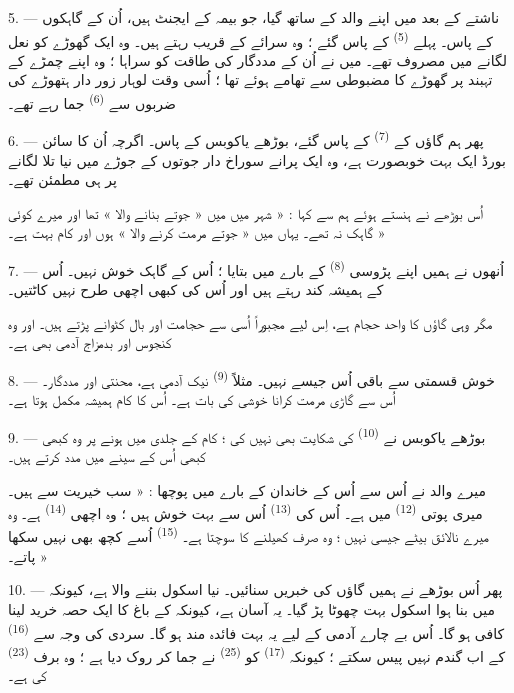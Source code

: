 \VUsaut{3.0mm}

5. --- ناشتے کے بعد میں اپنے والد کے ساتھ گیا، جو بیمہ کے ایجنٹ ہیں،
اُن کے گاہکوں کے پاس۔ پہلے  \textsuperscript{(5)} کے
پاس گئے ؛ وہ سرائے کے قریب رہتے ہیں۔ وہ ایک گھوڑے کو نعل لگانے میں
مصروف تھے۔ میں نے اُن کے مددگار کی طاقت کو سراہا ؛ وہ اپنے چمڑے کے
تہبند پر گھوڑے کا  مضبوطی سے تھامے ہوئے تھا ؛ اُسی وقت
لوہار زور دار ہتھوڑے کی ضربوں سے  \textsuperscript{(6)}
جما رہے تھے۔

6. --- پھر ہم گاؤں کے  \textsuperscript{(7)} کے پاس
گئے، بوڑھے یاکوبس کے پاس۔ اگرچہ اُن کا سائن بورڈ ایک بہت خوبصورت
 ہے، وہ ایک پرانے سوراخ دار جوتوں کے جوڑے میں نیا تلا
لگانے پر ہی مطمئن تھے۔

اُس بوڑھے نے ہنستے ہوئے ہم سے کہا : « شہر میں میں « جوتے بنانے والا »
تھا اور میرے کوئی گاہک نہ تھے۔ یہاں میں « جوتے مرمت کرنے والا » ہوں
اور کام بہت ہے۔ »

7. --- اُنھوں نے ہمیں اپنے پڑوسی  \textsuperscript{(8)}
کے بارے میں بتایا ؛ اُس کے گاہک خوش نہیں۔ اُس کے 
ہمیشہ کند رہتے ہیں اور اُس کی  کبھی اچھی طرح نہیں
کاٹتیں۔

مگر وہی گاؤں کا واحد حجام ہے، اِس لیے مجبوراً اُسی سے حجامت اور بال
کٹوانے پڑتے ہیں۔ اور وہ کنجوس اور بدمزاج آدمی بھی ہے۔

8. --- خوش قسمتی سے باقی  اُس جیسے نہیں۔ مثلاً
 \textsuperscript{(9)} نیک آدمی ہے، محنتی اور
مددگار۔ اُس سے گاڑی مرمت کرانا خوشی کی بات ہے۔ اُس کا کام ہمیشہ
مکمل ہوتا ہے۔

9. --- بوڑھے یاکوبس نے  \textsuperscript{(10)} کی
شکایت بھی نہیں کی ؛ کام کے جلدی میں ہونے پر وہ کبھی کبھی اُس کے
 سینے میں مدد کرتے ہیں۔

میرے والد نے اُس سے اُس کے خاندان کے بارے میں پوچھا : « سب خیریت سے
ہیں۔ میری پوتی  \textsuperscript{(12)} میں ہے۔ اُس کی
 \textsuperscript{(13)} اُس سے بہت خوش ہیں ؛ وہ اچھی
 \textsuperscript{(14)} ہے۔ وہ میرے نالائق بیٹے جیسی
نہیں ؛ وہ صرف کھیلنے کا سوچتا ہے۔ 
\textsuperscript{(15)} اُسے کچھ بھی نہیں سکھا پاتے۔ »

\VUsaut{3.0mm}
\VUsaut{3.0mm}

10. --- پھر اُس بوڑھے نے ہمیں گاؤں کی خبریں سنائیں۔ نیا اسکول بننے
والا ہے، کیونکہ  میں بنا ہوا اسکول بہت چھوٹا پڑ
گیا۔ یہ آسان ہے، کیونکہ  کے باغ کا ایک حصہ خرید لینا
کافی ہو گا۔ اُس بے چارے آدمی کے لیے یہ بہت فائدہ مند ہو گا۔ سردی کی
وجہ سے  \textsuperscript{(16)} کے  اب گندم
نہیں پیس سکتے ؛ کیونکہ  \textsuperscript{(17)} کو
 \textsuperscript{(25)} نے جما کر روک دیا ہے ؛ وہ برف
 \textsuperscript{(23)} کی ہے۔

